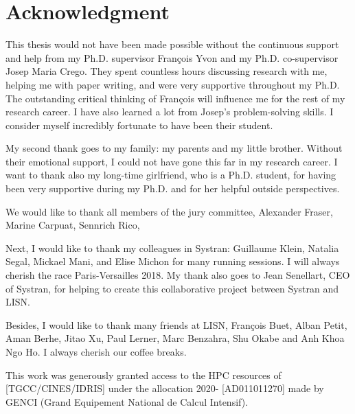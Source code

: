 \chapter*{Acknowledgment}
This thesis would not have been made possible without the continuous support and help from my Ph.D. supervisor François Yvon and my Ph.D. co-supervisor Josep Maria Crego. They spent countless hours discussing research with me, helping me with paper writing, and were very supportive throughout my Ph.D. The outstanding critical thinking of François will influence me for the rest of my research career. I have also learned a lot from Josep's problem-solving skills. I consider myself incredibly fortunate to have been their student.

My second thank goes to my family: my parents and my little brother. Without their emotional support, I could not have gone this far in my research career. I want to thank also my long-time girlfriend, who is a Ph.D. student, for having been very supportive during my Ph.D. and for her helpful outside perspectives.

We would like to thank all members of the jury committee, Alexander Fraser, Marine Carpuat, Sennrich Rico, 

Next, I would like to thank my colleagues in Systran: Guillaume Klein, Natalia Segal, Mickael Mani, and Elise Michon for many running sessions. I will always cherish the race Paris-Versailles 2018. My thank also goes to Jean Senellart, CEO of Systran, for helping to create this collaborative project between Systran and LISN. 

Besides, I would like to thank many friends at LISN, François Buet, Alban Petit, Aman Berhe, Jitao Xu, Paul Lerner, Marc Benzahra, Shu Okabe and Anh Khoa Ngo Ho. I always cherish our coffee breaks.

This work was generously granted access to the HPC resources of [TGCC/CINES/IDRIS] under the allocation 2020- [AD011011270] made by GENCI (Grand Equipement National de Calcul Intensif).